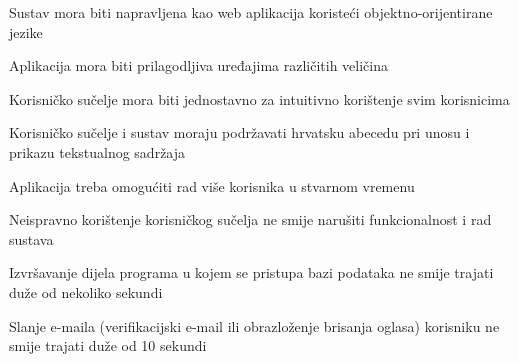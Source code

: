 		\begin{packed_item}
			
			\item Sustav mora biti napravljena kao web aplikacija koristeći objektno-orijentirane jezike
			\item Aplikacija mora biti prilagodljiva uređajima različitih veličina
			\item Korisničko sučelje mora biti jednostavno za intuitivno korištenje svim korisnicima
			\item Korisničko sučelje i sustav moraju podržavati hrvatsku abecedu pri unosu i prikazu tekstualnog sadržaja
			\item Aplikacija treba omogućiti rad više korisnika u stvarnom vremenu
			\item Neispravno korištenje korisničkog sučelja ne smije narušiti funkcionalnost i rad sustava
			\item Izvršavanje dijela programa u kojem se pristupa bazi podataka ne smije trajati duže od nekoliko sekundi
			\item Slanje e-maila (verifikacijski e-mail ili obrazloženje brisanja oglasa) korisniku ne smije trajati duže od 10 sekundi
			
		\end{packed_item}		
				
			 
			 
			 
	